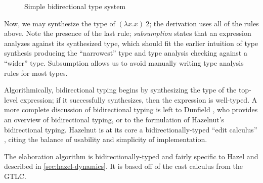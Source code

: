 \begin{figure}
  \centering
  \begin{mdframed}
    \begin{singlespace}
    \end{singlespace}
  \end{mdframed}
  \caption{Simple bidirectional type system}
  \label{fig:bidirectional-typing}
\end{figure}

Now, we may synthesize the type of $(\lambda x.x)\ 2$; the derivation uses all of the rules above. Note the presence of the last rule; \textit{subsumption} states that an expression analyzes against its synthesized type, which should fit the earlier intuition of type synthesis producing the ``narrowest'' type and type analysis checking against a ``wider'' type. Subsumption allows us to avoid manually writing type analysis rules for most types.

Algorithmically, bidirectional typing begins by synthesizing the type of the top-level expression; if it successfully synthesizes, then the expression is well-typed. A more complete discussion of bidirectional typing is left to Dunfield \cite{Dunfield_2022}, who provides an overview of bidirectional typing, or to the formulation of Hazelnut's bidirectional typing. Hazelnut is at its core a bidirectionally-typed ``edit calculus'' \cite{conf/popl/Hazelnut17}, citing the balance of usability and simplicity of implementation.

The elaboration algorithm is bidirectionally-typed and fairly specific to Hazel and described in \cref{sec:hazel-dynamics}. It is based off of the cast calculus from the GTLC.

